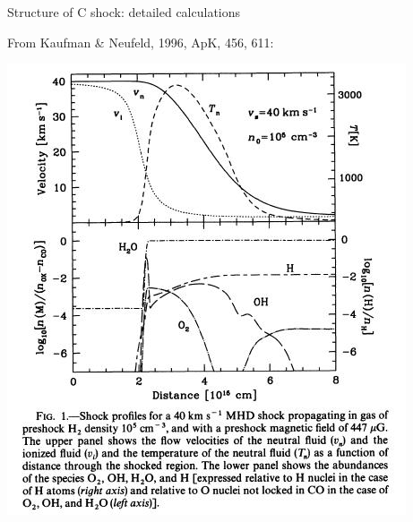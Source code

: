 \begin{frame}{Structure of C shock:  detailed calculations}

From Kaufman \& Neufeld, 1996, ApK, 456, 611:


\begin{minipage}[t]{0.49\textwidth}
  \begin{center}
    \includegraphics[width=\textwidth,height=!]{./E/Fig1_Kaufman_Neufeld.jpg}
    \end{center}
\end{minipage}
\begin{minipage}[t]{0.49\textwidth}
  \begin{center}

\end{center}
\end{minipage}
\end{frame}
